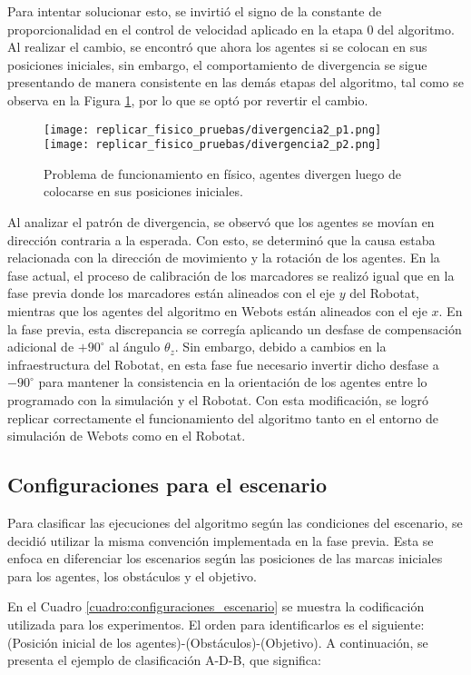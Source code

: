 Para intentar solucionar esto, se invirtió el signo de la constante de proporcionalidad en el control de velocidad aplicado en la etapa 0 del algoritmo. Al realizar el cambio, se encontró que ahora los agentes si se colocan en sus posiciones iniciales, sin embargo, el comportamiento de divergencia se sigue presentando de manera consistente en las demás etapas del algoritmo, tal como se observa en la Figura \ref{fig:divergencia2}, por lo que se optó por revertir el cambio.

\begin{figure}[H]
	\centering
	\texttt{[image: replicar\_fisico\_pruebas/divergencia2\_p1.png]}
	\texttt{[image: replicar\_fisico\_pruebas/divergencia2\_p2.png]}
	\caption{Problema de funcionamiento en físico, agentes divergen luego de colocarse en sus posiciones iniciales.}
	\label{fig:divergencia2}
\end{figure}

Al analizar el patrón de divergencia, se observó que los agentes se movían en dirección contraria a la esperada. Con esto, se determinó que la causa estaba relacionada con la dirección de movimiento y la rotación de los agentes. En la fase actual, el proceso de calibración de los marcadores se realizó igual que en la fase previa donde los marcadores están alineados con el eje $y$ del Robotat, mientras que los agentes del algoritmo en Webots están alineados con el eje $x$. En la fase previa, esta discrepancia se corregía aplicando un desfase de compensación adicional de $+90^{\circ}$ al ángulo $\theta_z$. Sin embargo, debido a cambios en la infraestructura del Robotat, en esta fase fue necesario invertir dicho desfase a $-90^{\circ}$ para mantener la consistencia en la orientación de los agentes entre lo programado con la simulación y el Robotat. Con esta modificación, se logró replicar correctamente el funcionamiento del algoritmo tanto en el entorno de simulación de Webots como en el Robotat.

\subsection{Configuraciones para el escenario}
Para clasificar las ejecuciones del algoritmo según las condiciones del escenario, se decidió utilizar la misma convención implementada en la fase previa. Esta se enfoca en diferenciar los escenarios según las posiciones de las marcas iniciales para los agentes, los obstáculos y el objetivo.

En el Cuadro \ref{cuadro:configuraciones_escenario} se muestra la codificación utilizada para los experimentos. El orden para identificarlos es el siguiente: (Posición inicial de los agentes)-(Obstáculos)-(Objetivo). A continuación, se presenta el ejemplo de clasificación A-D-B, que significa:

